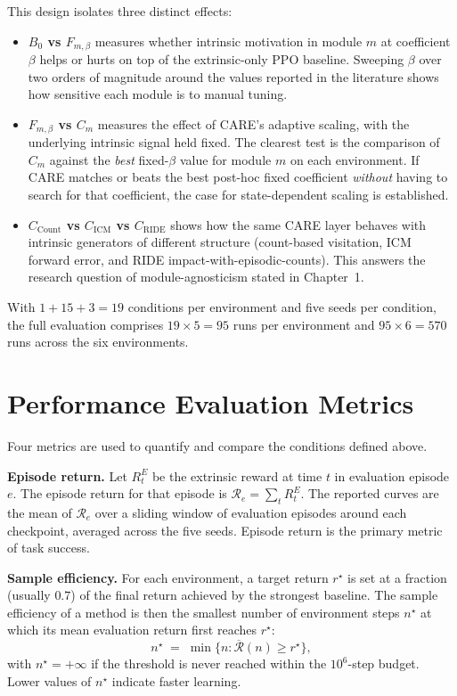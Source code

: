This design isolates three distinct effects:
\begin{itemize}
    \item \textbf{$B_0$ vs $F_{m,\beta}$} measures whether intrinsic motivation in module $m$ at coefficient $\beta$ helps or hurts on top of the extrinsic-only PPO baseline. Sweeping $\beta$ over two orders of magnitude around the values reported in the literature shows how sensitive each module is to manual tuning.
    \item \textbf{$F_{m,\beta}$ vs $C_m$} measures the effect of CARE's adaptive scaling, with the underlying intrinsic signal held fixed. The clearest test is the comparison of $C_m$ against the \emph{best} fixed-$\beta$ value for module $m$ on each environment. If CARE matches or beats the best post-hoc fixed coefficient \emph{without} having to search for that coefficient, the case for state-dependent scaling is established.
    \item \textbf{$C_\text{Count}$ vs $C_\text{ICM}$ vs $C_\text{RIDE}$} shows how the same CARE layer behaves with intrinsic generators of different structure (count-based visitation, ICM forward error, and RIDE impact-with-episodic-counts). This answers the research question of module-agnosticism stated in Chapter~1.
\end{itemize}

With $1 + 15 + 3 = 19$ conditions per environment and five seeds per condition, the full evaluation comprises $19 \times 5 = 95$ runs per environment and $95 \times 6 = 570$ runs across the six environments.

\section{Performance Evaluation Metrics}
\label{sec:metrics}

Four metrics are used to quantify and compare the conditions defined above.

\textbf{Episode return.} Let $R^E_t$ be the extrinsic reward at time $t$ in evaluation episode $e$. The episode return for that episode is $\mathcal{R}_e = \sum_t R^E_t$. The reported curves are the mean of $\mathcal{R}_e$ over a sliding window of evaluation episodes around each checkpoint, averaged across the five seeds. Episode return is the primary metric of task success.

\textbf{Sample efficiency.} For each environment, a target return $r^\star$ is set at a fraction (usually $0.7$) of the final return achieved by the strongest baseline. The sample efficiency of a method is then the smallest number of environment steps $n^\star$ at which its mean evaluation return first reaches $r^\star$:
\begin{equation*}
n^\star \;=\; \min\bigl\{ n : \overline{\mathcal{R}}(n) \ge r^\star \bigr\},
\end{equation*}
with $n^\star = +\infty$ if the threshold is never reached within the $10^6$-step budget. Lower values of $n^\star$ indicate faster learning.

